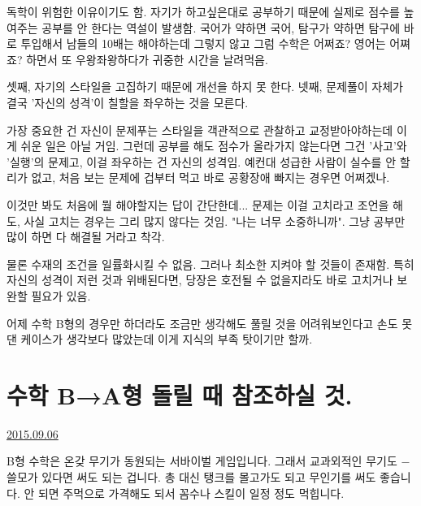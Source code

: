 독학이 위험한 이유이기도 함. 자기가 하고싶은대로 공부하기 때문에 실제로 점수를 높여주는 공부를 안 한다는 역설이 발생함.
국어가 약하면 국어, 탐구가 약하면 탐구에 바로 투입해서 남들의 10배는 해야하는데 그렇지 않고
그럼 수학은 어쩌죠? 영어는 어쪄죠? 하면서 또 우왕좌왕하다가 귀중한 시간을 날려먹음.
\vspace{5mm}

셋째, 자기의 스타일을 고집하기 때문에 개선을 하지 못 한다.
넷째, 문제풀이 자체가 결국 '자신의 성격'이 칠할을 좌우하는 것을 모른다.
\vspace{5mm}

가장 중요한 건 자신이 문제푸는 스타일을 객관적으로 관찰하고 교정받아야하는데 이게 쉬운 일은 아닐 거임.
그런데 공부를 해도 점수가 올라가지 않는다면 그건 '사고'와 '실행'의 문제고, 이걸 좌우하는 건 자신의 성격임.
예컨대 성급한 사람이 실수를 안 할 리가 없고, 처음 보는 문제에 겁부터 먹고 바로 공황장애 빠지는 경우면 어쩌겠나.
\vspace{5mm}

이것만 봐도 처음에 뭘 해야할지는 답이 간단한데...
문제는 이걸 고치라고 조언을 해도, 사실 고치는 경우는 그리 많지 않다는 것임.
"나는 너무 소중하니까".
그냥 공부만 많이 하면 다 해결될 거라고 착각.
\vspace{5mm}

물론 수재의 조건을 일률화시킬 수 없음. 그러나 최소한 지켜야 할 것들이 존재함.
특히 자신의 성격이 저런 것과 위배된다면, 당장은 호전될 수 없을지라도 바로 고치거나 보완할 필요가 있음.
\vspace{5mm}

어제 수학 B형의 경우만 하더라도 조금만 생각해도 풀릴 것을 어려워보인다고 손도 못 댄 케이스가 생각보다 많았는데
이게 지식의 부족 탓이기만 할까.
\vspace{5mm}








\section{수학 B→A형 돌릴 때 참조하실 것.}
\href{https://www.kockoc.com/Apoc/296976}{2015.09.06}

\vspace{5mm}

B형 수학은 온갖 무기가 동원되는 서바이벌 게임입니다.
그래서 교과외적인 무기도 $-$ 쓸모가 있다면 써도 되는 겁니다.
총 대신 탱크를 몰고가도 되고 무인기를 써도 좋습니다. 안 되면 주먹으로 가격해도 되서 꼼수나 스킬이 일정 정도 먹힙니다.
\vspace{5mm}

